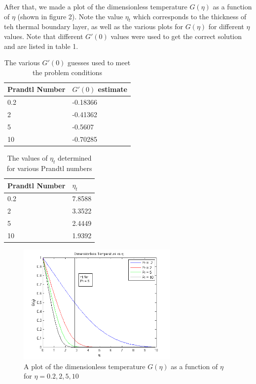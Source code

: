 \documentclass{article}
\begin{document}
After that, we made a plot of the dimensionless temperature $G(\eta)$ as a function of $\eta$ (shown in figure 2). Note the value $\eta_t$ which corresponds to the thickness of teh thermal boundary layer, as well as the various plots for $G(\eta)$ for different $\eta$ values. Note that different $G'(0)$ values were used to get the correct solution and are listed in table 1.
\begin{table}[H]
    \centering
    \begin{tabular}{|l|l|}
        \hline
        Prandtl Number & $G'(0)$ estimate\\\hline
        0.2 &-0.18366 \\\hline
        2   &-0.41362 \\\hline
        5   &-0.5607  \\\hline
        10  &-0.70285 \\\hline
    \end{tabular}
    \caption{The various $G'(0)$ guesses used to meet the problem conditions}
\end{table}
\begin{table}[H]
    \centering
    \begin{tabular}{|l|l|}
        \hline
        Prandtl Number & $\eta_t$\\\hline
        0.2 &7.8588 \\\hline
        2   &3.3522 \\\hline
        5   &2.4449  \\\hline
        10  &1.9392  \\\hline
    \end{tabular}
    \caption{The values of $\eta_t$ determined for various Prandtl numbers}
\end{table}
\begin{figure}[H]
    \centering
    \includegraphics[width=0.7\textwidth]{gplots.png}
    \caption{A plot of the dimensionless temperature $G(\eta)$ as a function of $\eta$ for $\eta=0.2,2,5,10$}
\end{figure}
\end{document}
